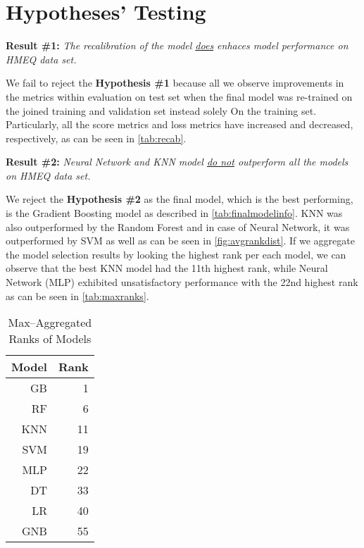 \chapter{Hypotheses' Testing}
\label{chap:five}

\noindent \textbf{Result \#1:} \textit{The recalibration of the model \underline{does} enhaces model performance on HMEQ data set.}

We fail to reject the \textbf{Hypothesis \#1} because all we observe improvements in the metrics within evaluation on test set when the final model was re-trained on the joined training and validation set instead solely On the training set.
Particularly, all the score metrics and loss metrics have increased and decreased, respectively, as can be seen in \autoref{tab:recab}.

\vspace{0.3cm}

\noindent \textbf{Result \#2:} \textit{Neural Network and KNN model \underline{do not} outperform all the models on HMEQ data set.}

We reject the \textbf{Hypothesis \#2} as the final model, which is the best performing, is the Gradient Boosting model as described in \autoref{tab:finalmodelinfo}.
KNN was also outperformed by the Random Forest and in case of Neural Network, it was outperformed by SVM as well as can be seen in 
\autoref{fig:avgrankdist}.
If we aggregate the model selection results by looking the highest rank per each model, we can observe that the best KNN model had the 11th highest rank, while Neural Network (MLP) exhibited unsatisfactory performance with the 22nd highest rank as can be seen in \autoref{tab:maxranks}.

\begin{table}[H]
    \small
    \setlength{\tabcolsep}{8pt}
    \renewcommand{\arraystretch}{1.3}
    \centering
        \caption[Max--Aggregated Ranks of Models]{Max--Aggregated Ranks of Models}\label{tab:maxranks}
        \begin{tabular}{r r}
    \toprule
    \textbf{Model} & \textbf{Rank}\\
    \midrule
    \hline
    GB & 1 \\ 
    RF & 6 \\ 
    KNN & 11 \\ 
    SVM & 19 \\ 
    MLP & 22 \\ 
    DT & 33 \\ 
    LR & 40 \\
    GNB & 55 \\
    \hline
    \bottomrule
    \end{tabular}
    \vspace{0.35em}

        \vspace{-1em}
\end{table}

